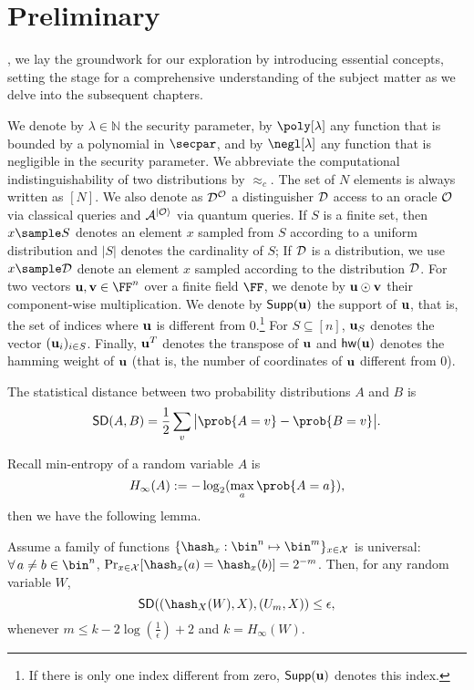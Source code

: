 
\chapter{Preliminary}
\label{sec:prelim}
, we lay the groundwork for our exploration by introducing essential concepts, setting the stage for a comprehensive understanding of the subject matter as we delve into the subsequent chapters.

We denote by $\lambda \in\mathbb{N}$ the security parameter, by $\poly[\lambda]$ any function that is bounded by a polynomial in $\secpar$, and by $\negl[\lambda]$ any
function that is negligible in the security parameter. We abbreviate the computational indistinguishability of two distributions by $\approx_c$. The set of $N$ elements is always written as $[N]$. We also denote as $\mathcal{D}^{\mathcal{O}}$ a distinguisher $\mathcal{D}$ access to an oracle $\mathcal{O}$ via classical queries and $\mathcal{A}^{|\mathcal{O}\rangle}$ via quantum queries. 
If $S$ is a finite set, then  $x\sample S$  denotes an element $x$ sampled from $S$ according to a uniform distribution and $|S|$ denotes the cardinality of $S$; If \(\mathcal{D}\) is a distribution, we use \(x\sample\Dc\) denote an element \(x\) sampled according to the distribution \(\mathcal{D}\).
For two vectors $\un,\vn\in\FF^n$ over a finite field $\FF$, we denote by $\mathbf{u}\odot \mathbf{v}$ their component-wise multiplication. We denote by $\mathsf{Supp}(\mathbf{u})$ the support of $\mathbf{u}$, that is, the set of indices where $\mathbf{u}$ is different from $0$.\footnote{If there is only one index different from zero, $\mathsf{Supp}(\mathbf{u})$ denotes this index.} For $S\subseteq [n]$, $\mathbf{u}_S$ denotes the vector $(\mathbf{u}_i)_{i\in S}$. Finally, $\mathbf{u}^T$ denotes the transpose of $\mathbf{u}$ and $\mathsf{hw}(\mathbf{u})$ denotes the hamming weight of $\mathbf{u}$ (that is, the number of coordinates of $\mathbf{u}$ different from $0$).


\begin{definition}
The statistical distance between two probability distributions $A$ and $B$ is 
$$\sd(A,B)=\frac{1}{2}\sum_v\big|\prob{A=v}-\prob{B=v}\big|.
$$
\end{definition}

Recall min-entropy of a random variable $A$ is 
$$H_\infty(A):=-\log_2(\max_a \prob{A=a}),$$
then we have the following lemma.
\begin{lemma}
Assume a family of functions $\{\hash_x:\bin^n\mapsto\bin^m\}_{x\in\Xc}$ is universal: $\forall\, a\ne b\in\bin^n$, $\Pr_{x\in\Xc}[\hash_x(a)=\hash_x(b)]=2^{-m}$. Then, for any random variable $W$,
$$\sd((\hash_X(W),X), (U_m,X))\le \epsilon,
$$
whenever $m\le k-2\log(\frac{1}{\epsilon})+2$ and $k=H_\infty(W).$
\end{lemma}

